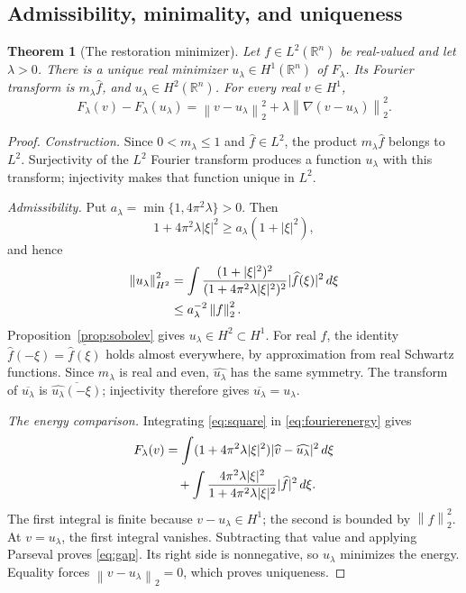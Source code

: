 \documentclass[11pt]{article}
\numberwithin{equation}{section}
\newtheorem{theorem}{Theorem}[section]
\theoremstyle{definition}
\theoremstyle{remark}
\newcommand{\R}{\mathbb R}
\newcommand{\dd}{\,d}
\newcommand{\norm}[1]{\left\|#1\right\|}
\newcommand{\wh}[1]{\widehat{#1}}
\begin{document}
\subsection{Admissibility, minimality, and uniqueness}
\begin{theorem}[The restoration minimizer]\label{thm:minimizer}
Let \(f\in L^2(\R^n)\) be real-valued and let \(\lambda>0\). There is a unique real minimizer \(u_\lambda\in H^1(\R^n)\) of \(F_\lambda\). Its Fourier transform is \(m_\lambda\wh f\), and \(u_\lambda\in H^2(\R^n)\). For every real \(v\in H^1\),
\begin{equation}\label{eq:gap}
 F_\lambda(v)-F_\lambda(u_\lambda)
 =\norm{v-u_\lambda}_2^2
      +\lambda\norm{\nabla(v-u_\lambda)}_2^2.
\end{equation}
\end{theorem}
\begin{proof}
\emph{Construction.} Since \(0<m_\lambda\le1\) and \(\wh f\in L^2\), the product \(m_\lambda\wh f\) belongs to \(L^2\). Surjectivity of the \(L^2\) Fourier transform produces a function \(u_\lambda\) with this transform; injectivity makes that function unique in \(L^2\).

\emph{Admissibility.} Put \(a_\lambda=\min\{1,4\pi^2\lambda\}>0\). Then
\[
 1+4\pi^2\lambda|\xi|^2\ge a_\lambda(1+|\xi|^2),
\]
and hence
\begin{align}\label{eq:h2gain}
 \norm{u_\lambda}_{H^2}^2
 &=\int\frac{(1+|\xi|^2)^2}{(1+4\pi^2\lambda|\xi|^2)^2}
                                    |\wh f(\xi)|^2\dd\xi\notag\\
 &\le a_\lambda^{-2}\norm f_2^2.
\end{align}
Proposition~\ref{prop:sobolev} gives \(u_\lambda\in H^2\subset H^1\).
For real \(f\), the identity
\(\wh f(-\xi)=\overline{\wh f(\xi)}\) holds almost everywhere, by approximation from real Schwartz functions. Since \(m_\lambda\) is real and even, \(\wh{u_\lambda}\) has the same symmetry. The transform of \(\overline{u_\lambda}\) is \(\overline{\wh{u_\lambda}(-\xi)}\); injectivity therefore gives \(\overline{u_\lambda}=u_\lambda\).

\emph{The energy comparison.} Integrating \eqref{eq:square} in \eqref{eq:fourierenergy} gives
\begin{align}\label{eq:completedenergy}
 F_\lambda(v)
 &=\int(1+4\pi^2\lambda|\xi|^2)
                    |\wh v-\wh{u_\lambda}|^2\dd\xi\notag\\
 &\quad+\int\frac{4\pi^2\lambda|\xi|^2}
                    {1+4\pi^2\lambda|\xi|^2}|\wh f|^2\dd\xi.
\end{align}
The first integral is finite because \(v-u_\lambda\in H^1\); the second is bounded by \(\norm f_2^2\). At \(v=u_\lambda\), the first integral vanishes. Subtracting that value and applying Parseval proves \eqref{eq:gap}. Its right side is nonnegative, so \(u_\lambda\) minimizes the energy. Equality forces \(\norm{v-u_\lambda}_2=0\), which proves uniqueness.
\end{proof}
\end{document}
